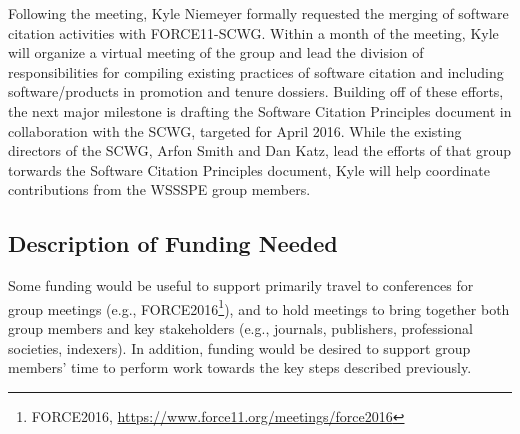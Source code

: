 Following the meeting, Kyle Niemeyer formally requested the merging of software citation activities with FORCE11-SCWG.
Within a month of the meeting, Kyle will organize a virtual meeting of the group and lead the division of responsibilities for compiling existing practices of software citation and including software\slash products in promotion and tenure dossiers.
Building off of these efforts, the next major milestone is drafting the Software Citation Principles document in collaboration with the SCWG, targeted for April 2016.
While the existing directors of the SCWG, Arfon Smith and Dan Katz, lead the efforts of that group torwards the Software Citation Principles document, Kyle will help coordinate contributions from the WSSSPE group members.


\subsection{Description of Funding Needed}

Some funding would be useful to support primarily travel to conferences for group meetings (e.g., FORCE2016\footnote{FORCE2016, \url{https://www.force11.org/meetings/force2016}}), and to hold meetings to bring together both group members and key stakeholders (e.g., journals, publishers, professional societies, indexers).
In addition, funding would be desired to support group members' time to perform work towards the key steps described previously.
